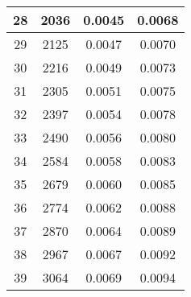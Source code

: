 \begin{table}[!h]
\begin{tabular}{|c||c|c|c|}
        28 & 2036 & 0.0045 & 0.0068 \\\hline
        29 & 2125 & 0.0047 & 0.0070 \\\hline
        30 & 2216 & 0.0049 & 0.0073 \\\hline
        31 & 2305 & 0.0051 & 0.0075 \\\hline
        32 & 2397 & 0.0054 & 0.0078 \\\hline
        33 & 2490 & 0.0056 & 0.0080 \\\hline
        34 & 2584 & 0.0058 & 0.0083 \\\hline
        35 & 2679 & 0.0060 & 0.0085 \\\hline
        36 & 2774 & 0.0062 & 0.0088 \\\hline
        37 & 2870 & 0.0064 & 0.0089 \\\hline
        38 & 2967 & 0.0067 & 0.0092 \\\hline
        39 & 3064 & 0.0069 & 0.0094 \\\bottomrule
    \end{tabular}
    \label{tab:1}
\end{table}

